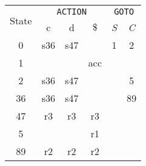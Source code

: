 \documentclass[border=0.8ex,varwidth]{standalone}
\begin{document}
\begin{table}
  \begin{tabular}{cccccc}
    \toprule
    \multirow{2}{*}{State} & \multicolumn{3}{c}{\texttt{ACTION}} &
                                                                  \multicolumn{2}{c}{\texttt{GOTO}}\\
    \cline{2-6}
                          & c & d & \(\$\) & \textit{S} & \textit{C} \\
    \midrule
    0 & s36 & s47 & & 1 & 2\\
    1 & & & acc & & \\
    2 & s36 & s47 & & & 5\\
    36 & s36 & s47 & & & 89\\
    47 & r3 & r3 & r3 & & \\
    5 & & & r1 & & \\
    89 & r2 & r2 & r2 & & \\
    \bottomrule
  \end{tabular}
\end{table}
\end{document}

